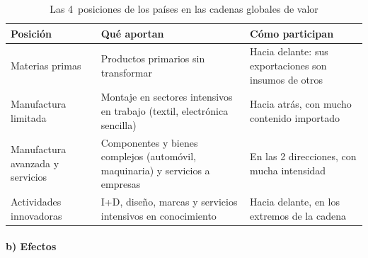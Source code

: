 \documentclass[11pt]{article}
\begin{document}
\begin{table}[H]
\centering
\caption{Las 4~posiciones de los países en las cadenas globales de valor}\label{tab:cgv-tipos}
\small
\begin{tabular}{>{\raggedright\arraybackslash}m{3.6cm}>{\raggedright\arraybackslash}m{5.2cm}>{\raggedright\arraybackslash}m{5.2cm}}
\toprule
\rowcolor{tceeazulpalido} \textbf{Posición} & \textbf{Qué aportan} & \textbf{Cómo participan} \\
\midrule
Materias primas & Productos primarios sin transformar & Hacia delante: sus exportaciones son insumos de otros \\
\addlinespace
Manufactura limitada & Montaje en sectores intensivos en trabajo (textil, electrónica sencilla) & Hacia atrás, con mucho contenido importado \\
\addlinespace
Manufactura avanzada y servicios & Componentes y bienes complejos (automóvil, maquinaria) y servicios a empresas & En las 2 direcciones, con mucha intensidad \\
\addlinespace
Actividades innovadoras & I+D, diseño, marcas y servicios intensivos en conocimiento & Hacia delante, en los extremos de la cadena \\
\bottomrule
\end{tabular}
\end{table}

\paragraph{b) Efectos}
\end{document}
